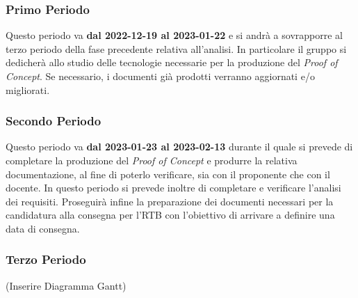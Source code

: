 \subsubsection{Primo Periodo}
Questo periodo va \textbf{dal 2022-12-19 al 2023-01-22} e si andrà a sovrapporre al terzo periodo della fase precedente relativa all'analisi. In particolare il gruppo si dedicherà allo studio delle tecnologie necessarie per la produzione del {\it{Proof of Concept}}. Se necessario, i documenti già prodotti verranno aggiornati e/o migliorati.

\subsubsection{Secondo Periodo}
Questo periodo va \textbf{dal 2023-01-23 al 2023-02-13} durante il quale si prevede di completare la produzione del {\it{Proof of Concept}} e produrre la relativa documentazione, al fine di poterlo verificare, sia con il proponente che con il docente. In questo periodo si prevede inoltre di completare e verificare l'analisi dei requisiti.
Proseguirà infine la preparazione dei documenti necessari per la candidatura alla consegna per l'RTB con l'obiettivo di arrivare a definire una data di consegna.

\subsubsection{Terzo Periodo}

(Inserire Diagramma Gantt)